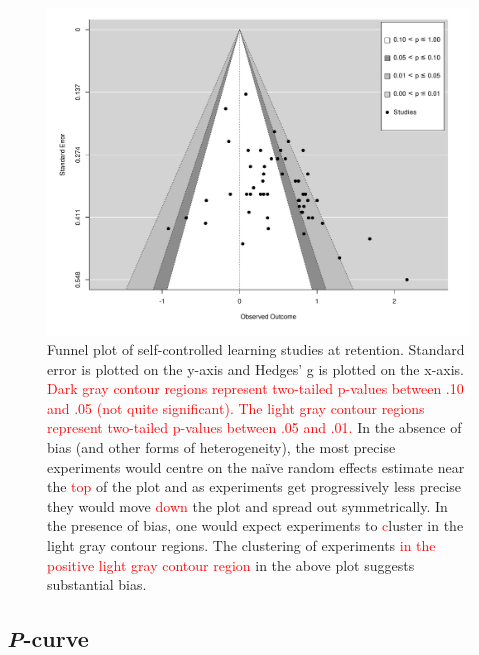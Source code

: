 \documentclass[
  english,
  man,floatsintext]{apa7}
\begin{document}
\begin{figure}

{\centering \includegraphics{../../figs/fig4} 

}

\caption{Funnel plot of self-controlled learning studies at retention. Standard error is plotted on the y-axis and Hedges' g is plotted on the x-axis. \textcolor{red}{Dark gray contour regions represent two-tailed p-values between .10 and .05 (not quite significant). The light gray contour regions represent two-tailed p-values between .05 and .01.} In the absence of bias (and other forms of heterogeneity), the most precise experiments would centre on the naïve random effects estimate near the \textcolor{red} {top} of the plot and as experiments get progressively less precise they would move \textcolor{red}{down} the plot and spread out symmetrically. In the presence of bias, one would expect experiments to \textcolor{red} cluster in the light gray contour regions. The clustering of experiments \textcolor{red}{in the positive light gray  contour region} in the above plot suggests substantial bias.}\label{fig:fig4}
\end{figure}

\hypertarget{p-curve}{%
\subsection{\texorpdfstring{\emph{P}-curve}{P-curve}}\label{p-curve}}
\end{document}
